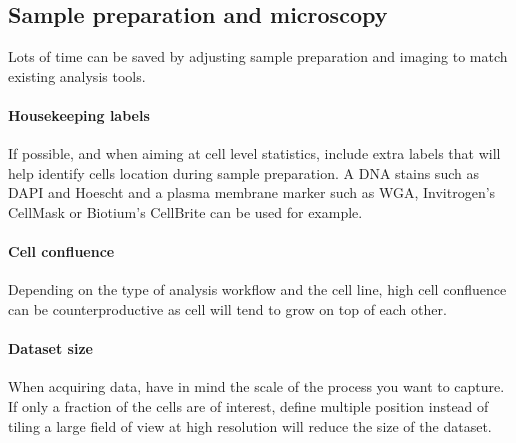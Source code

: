 \subsection{Sample preparation and microscopy}

Lots of time can be saved by adjusting sample preparation and imaging to match existing  analysis tools.

\paragraph{Housekeeping labels} If possible, and when aiming at cell level statistics, include extra labels that will help identify cells location during sample preparation. A DNA stains such as DAPI and Hoescht and a plasma membrane marker such as WGA, Invitrogen's CellMask or Biotium's CellBrite can be used for example. 

\paragraph{Cell confluence} Depending on the type of analysis workflow and the cell line, high cell confluence can be counterproductive as cell will tend to grow on top of each other.

\paragraph{Dataset size} When acquiring data, have in mind the scale of the process you want to capture. If only a fraction of the cells are of interest, define multiple position instead of tiling a large field of view at high resolution will reduce the size of the dataset.





